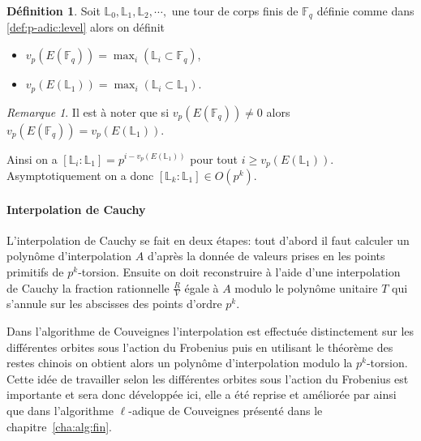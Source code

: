 \documentclass[10pt,a4paper]{book}
\theoremstyle{plain}
\theoremstyle{definition}
\theoremstyle{definition}
\theoremstyle{definition}
\theoremstyle{definition}
\newtheorem{defi}[thm]{Définition}
\theoremstyle{remark}
\newtheorem{rem}[thm]{Remarque}
\theoremstyle{remark}
\theoremstyle{definition}
\begin{document}

\begin{defi}
Soit $\mathbb{L}_0, \mathbb{L}_1, \mathbb{L}_2, \cdots, $ une tour de corps 
finis de $\mathbb{F}_q$ définie comme dans \ref{def:p-adic:level} alors on 
définit
\begin{itemize}
\item $v_p(E(\mathbb{F}_q))=\max_i\left( \mathbb{L}_i \subset \mathbb{F}_q \right)$,
\item $v_p(E(\mathbb{L}_1))=\max_i\left( \mathbb{L}_i \subset \mathbb{L}_1 \right)$.
\end{itemize}
\end{defi}

\begin{rem}
Il est à noter que si $v_p(E(\mathbb{F}_q)) \neq 0$ alors $v_p(E(\mathbb{F}_q))=v_p(E(\mathbb{L}_1))$.
\end{rem}

Ainsi on a $[\mathbb{L}_i:\mathbb{L}_1]=p^{i- v_p(E(\mathbb{L}_1))}$ pour tout $i \geqslant  v_p(E(\mathbb{L}_1))$. Asymptotiquement on a donc $[\mathbb{L}_k:\mathbb{L}_1] \in O(p^k)$.



\paragraph{Interpolation de Cauchy} L'interpolation de Cauchy se fait en deux étapes: tout d'abord il faut calculer un polynôme d'interpolation $A$ d'après la donnée de valeurs prises en les points primitifs de $p^k$-torsion. Ensuite on doit reconstruire à l'aide d'une interpolation de Cauchy la fraction rationnelle $\frac{R}{V}$ égale à $A$ modulo le polynôme unitaire $T$ qui s'annule sur les abscisses des points d'ordre $p^k$. 

Dans l'algorithme de Couveignes \cite{Couveignes96} l'interpolation est 
effectuée distinctement sur les différentes orbites sous l'action du Frobenius 
puis en utilisant le théorème des restes chinois on obtient alors un polynôme 
d'interpolation modulo la $p^k$-torsion. Cette idée de travailler selon les 
différentes orbites sous l'action du Frobenius est importante et sera donc 
développée ici, elle a été reprise et améliorée par \cite{DeFeo11} ainsi que 
dans l'algorithme $\ell$-adique de Couveignes présenté dans le 
chapitre~\ref{cha:alg:fin}.
\end{document}
